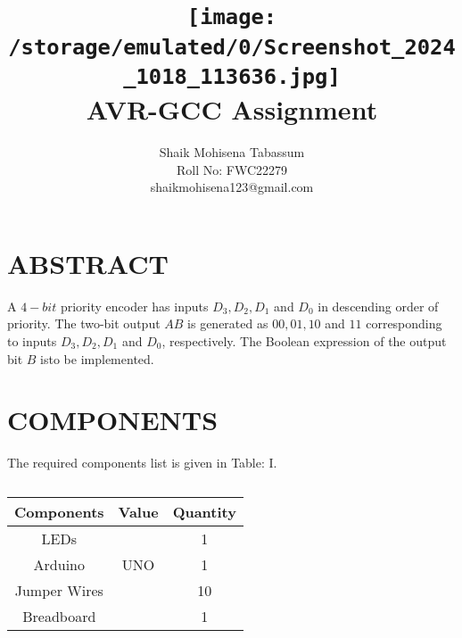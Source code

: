 \documentclass[conference]{IEEEtran}
\title{
\vspace{1cm}
{\texttt{[image: /storage/emulated/0/Screenshot\_2024\_1018\_113636.jpg]} \\ AVR-GCC Assignment} }
\author{Shaik Mohisena Tabassum \\ Roll No: FWC22279 \\ shaikmohisena123@gmail.com}
\begin{document}
\maketitle
 \section {ABSTRACT}
 A $4-bit$ priority encoder has inputs $D_3, D_2, D_1$ and $D_0$ in descending order of priority. The two-bit output $AB$ is generated as $00, 01, 10$ and $11$ corresponding to inputs $D_3, D_2, D_1$ and $D_0$, respectively. The Boolean expression of the output bit $B$ isto be implemented.
\section{COMPONENTS}
The required components list is given in Table: I. 
 \begin{table} [htbp]
\centering
\begin{tabular}{| c | c | c |} \hline
	\textbf{Components} & \textbf{Value} & \textbf{Quantity} \\\hline
LEDs &  & 1 \\ \hline
Arduino & UNO & 1 \\ \hline
Jumper Wires &  & 10 \\ \hline
Breadboard & & 1 \\ 
\hline
\end{tabular}
\vspace{0.1cm}
\caption{\label{tab:widgets}}
\end{table}
\end{document}
